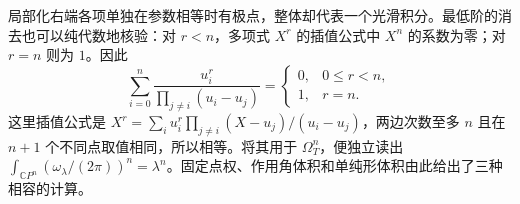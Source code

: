 局部化右端各项单独在参数相等时有极点，整体却代表一个光滑积分。最低阶的消去也可以纯代数地核验：对 \(r<n\)，多项式 \(X^r\) 的插值公式中 \(X^n\) 的系数为零；对 \(r=n\) 则为 \(1\)。因此
\[
	\sum_{i=0}^n\frac{u_i^r}{\prod_{j\ne i}(u_i-u_j)}
	=\begin{cases}0,&0\le r<n,\\1,&r=n.\end{cases}
\]
这里插值公式是
\(X^r=\sum_i u_i^r\prod_{j\ne i}(X-u_j)/(u_i-u_j)\)，两边次数至多 \(n\) 且在 \(n+1\) 个不同点取值相同，所以相等。将其用于 \(\Omega_T^n\)，便独立读出 \(\int_{\mathbb CP^n}(\omega_\lambda/(2\pi))^n=\lambda^n\)。固定点权、作用角体积和单纯形体积由此给出了三种相容的计算。

